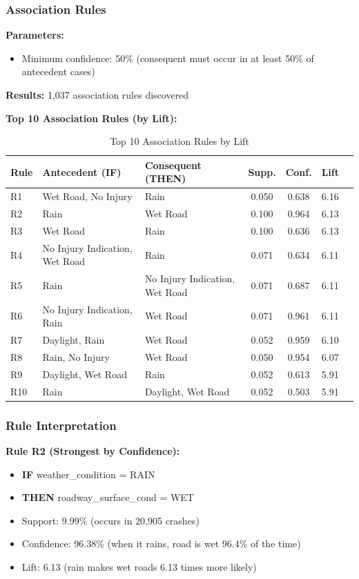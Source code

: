 \documentclass[12pt,man]{apa7}
\begin{document}
\subsubsection{Association Rules}

\textbf{Parameters:}
\begin{itemize}
    \item Minimum confidence: 50\% (consequent must occur in at least 50\% of antecedent cases)
\end{itemize}

\textbf{Results:} 1,037 association rules discovered

\textbf{Top 10 Association Rules (by Lift):}

\begin{table}[H]
\centering
\caption{Top 10 Association Rules by Lift}
\scriptsize
\begin{tabular}{lp{4cm}p{4cm}cccc}
\toprule
\textbf{Rule} & \textbf{Antecedent (IF)} & \textbf{Consequent (THEN)} & \textbf{Supp.} & \textbf{Conf.} & \textbf{Lift} \\
\midrule
R1 & Wet Road, No Injury & Rain & 0.050 & 0.638 & 6.16 \\
R2 & Rain & Wet Road & 0.100 & 0.964 & 6.13 \\
R3 & Wet Road & Rain & 0.100 & 0.636 & 6.13 \\
R4 & No Injury Indication, Wet Road & Rain & 0.071 & 0.634 & 6.11 \\
R5 & Rain & No Injury Indication, Wet Road & 0.071 & 0.687 & 6.11 \\
R6 & No Injury Indication, Rain & Wet Road & 0.071 & 0.961 & 6.11 \\
R7 & Daylight, Rain & Wet Road & 0.052 & 0.959 & 6.10 \\
R8 & Rain, No Injury & Wet Road & 0.050 & 0.954 & 6.07 \\
R9 & Daylight, Wet Road & Rain & 0.052 & 0.613 & 5.91 \\
R10 & Rain & Daylight, Wet Road & 0.052 & 0.503 & 5.91 \\
\bottomrule
\end{tabular}
\end{table}

\subsubsection{Rule Interpretation}

\textbf{Rule R2 (Strongest by Confidence):}
\begin{itemize}
    \item \textbf{IF} weather\_condition = RAIN
    \item \textbf{THEN} roadway\_surface\_cond = WET
    \item Support: 9.99\% (occurs in 20,905 crashes)
    \item Confidence: 96.38\% (when it rains, road is wet 96.4\% of the time)
    \item Lift: 6.13 (rain makes wet roads 6.13 times more likely)
\end{itemize}
\end{document}
